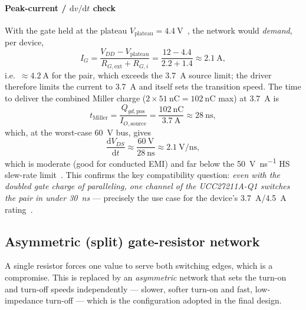 \documentclass[journal,onecolumn,11pt]{IEEEtran}
\begin{document}
\paragraph{Peak-current / $\mathrm{d}v/\mathrm{d}t$ check}
With the gate held at the plateau $V_{\mathrm{plateau}}=\SI{4.4}{\volt}$~\cite{ipt015ds}, the network
would \emph{demand}, per device,
\begin{equation}
I_{G} = \frac{V_{DD}-V_{\mathrm{plateau}}}{R_{G,\mathrm{ext}}+R_{G,i}}
      = \frac{12-4.4}{2.2+1.4} \approx \SI{2.1}{\ampere},
\end{equation}
i.e.\ $\approx\SI{4.2}{\ampere}$ for the pair, which exceeds the \SI{3.7}{\ampere} source limit;
the driver therefore limits the current to \SI{3.7}{\ampere} and itself sets the transition speed.
The time to deliver the combined Miller charge ($2\times\SI{51}{\nano\coulomb}=\SI{102}{\nano\coulomb}$
max) at \SI{3.7}{\ampere} is
\begin{equation}
t_{\mathrm{Miller}} = \frac{Q_{gd,\mathrm{pos}}}{I_{O,\mathrm{source}}}
   = \frac{\SI{102}{\nano\coulomb}}{\SI{3.7}{\ampere}} \approx \SI{28}{\nano\second},
\end{equation}
which, at the worst-case \SI{60}{\volt} bus, gives
\begin{equation}
\frac{\mathrm{d}V_{DS}}{\mathrm{d}t} \approx \frac{\SI{60}{\volt}}{\SI{28}{\nano\second}}
   \approx \SI{2.1}{\volt\per\nano\second},
\end{equation}
which is moderate (good for conducted EMI) and far below the \SI{50}{\volt\per\nano\second} HS
slew-rate limit~\cite{ucc27211}. This confirms the key compatibility question: \emph{even with the
doubled gate charge of paralleling, one channel of the UCC27211A-Q1 switches the pair in under
\SI{30}{\nano\second}} --- precisely the use case for the device's \SI{3.7}{\ampere}/\SI{4.5}{\ampere}
rating~\cite{ucc27211}.

\subsection{Asymmetric (split) gate-resistor network}\label{sec:asym}
A single resistor forces one value to serve both switching edges, which is a compromise. This is
replaced by an \emph{asymmetric} network that sets the turn-on and turn-off speeds independently ---
slower, softer turn-on and fast, low-impedance turn-off --- which is the configuration adopted in
the final design.
\end{document}
